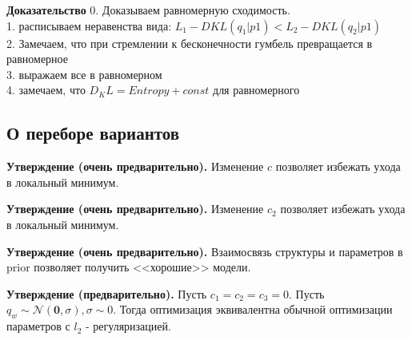 \textbf{Доказательство}
0. Доказываем равномерную сходимость.\\
1. расписываем неравенства вида: $L_1 - DKL(q_1|p1) <L_2 - DKL(q_2|p1)$\\
2. Замечаем, что при стремлении к бесконечности гумбель превращается в равномерное\\
3. выражаем все в равномерном\\
4. замечаем, что $D_KL = Entropy + const$ для равномерного




\subsection{О переборе вариантов}


\textbf{Утверждение (очень предварительно).} Изменение $c$ позволяет избежать ухода в локальный минимум. 

\textbf{Утверждение (очень предварительно).} Изменение $c_2$ позволяет избежать ухода в локальный минимум.

\textbf{Утверждение (очень предварительно).} Взаимосвязь структуры и параметров в prior позволяет получить <<хорошие>> модели.

\textbf{Утверждение (предварительно).} Пусть $c_1 = c_2 = c_3 = 0$. Пусть $q_w \sim \mathcal{N}(\mathbf{0}, \sigma), \sigma \sim 0$. 
Тогда оптимизация эквивалентна обычной оптимизации параметров с $l_2$ - регуляризацией.


